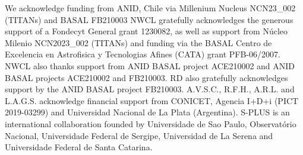 \documentclass[baaa]{baaa}
\begin{document}
\begin{acknowledgement}
We acknowledge funding from ANID, Chile via Millenium Nucleus NCN23\_002 (TITANs) and BASAL FB210003
NWCL gratefully acknowledges the generous support of a Fondecyt General grant 1230082, as well as support from Núcleo Milenio NCN2023\_002 (TITANs) and funding via the BASAL Centro de Excelencia en Astrofisica y Tecnologias Afines (CATA) grant PFB-06/2007.  NWCL also thanks support from ANID BASAL project ACE210002 and ANID BASAL projects ACE210002 and FB210003. RD also gratefully acknowledges support by the ANID BASAL project FB210003. A.V.S.C., R.F.H., A.R.L. and L.A.G.S. acknowledge financial support from CONICET, Agencia I+D+i (PICT 2019-03299) and Universidad Nacional de La Plata (Argentina). S-PLUS is an international collaboration founded by Universidade de Sao Paulo, Observatório Nacional,
Universidade Federal de Sergipe, Universidad de La Serena and Universidade Federal de Santa Catarina.
\end{acknowledgement}



\small

 
\end{document}
